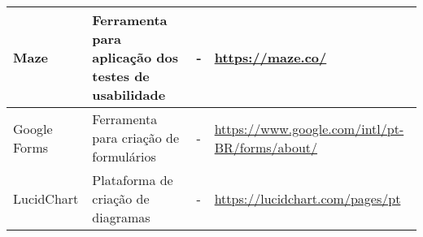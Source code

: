 \begin{table}[h]
\begin{adjustbox}{center}
{\begin{tabular}{l|l|l|l}
        Maze               & Ferramenta para aplicação dos testes de usabilidade           & -                                                                   & \href{https://maze.co/}{https://maze.co/}            \\ \hline
        Google Forms       & Ferramenta para criação de formulários                        & -                                                                   & \href{https://www.google.com/intl/pt-BR/forms/about/}{https://www.google.com/intl/pt-BR/forms/about/}            \\ \hline
        LucidChart         & Plataforma de criação de diagramas                            & -                                                                   & \href{https://lucidchart.com/pages/pt}{https://lucidchart.com/pages/pt}            \\ \hline
    \end{tabular}}
    \end{adjustbox}
\end{table}
